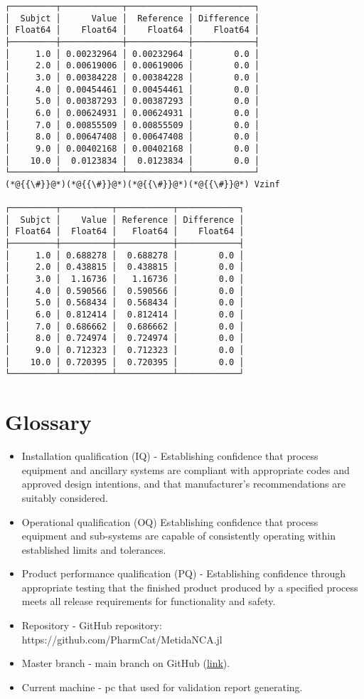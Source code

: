 \documentclass[12pt,a4paper]{article}
\begin{document}
\begin{lstlisting}
┌─────────┬────────────┬────────────┬────────────┐
│  Subjct │      Value │  Reference │ Difference │
│ Float64 │    Float64 │    Float64 │    Float64 │
├─────────┼────────────┼────────────┼────────────┤
│     1.0 │ 0.00232964 │ 0.00232964 │        0.0 │
│     2.0 │ 0.00619006 │ 0.00619006 │        0.0 │
│     3.0 │ 0.00384228 │ 0.00384228 │        0.0 │
│     4.0 │ 0.00454461 │ 0.00454461 │        0.0 │
│     5.0 │ 0.00387293 │ 0.00387293 │        0.0 │
│     6.0 │ 0.00624931 │ 0.00624931 │        0.0 │
│     7.0 │ 0.00855509 │ 0.00855509 │        0.0 │
│     8.0 │ 0.00647408 │ 0.00647408 │        0.0 │
│     9.0 │ 0.00402168 │ 0.00402168 │        0.0 │
│    10.0 │  0.0123834 │  0.0123834 │        0.0 │
└─────────┴────────────┴────────────┴────────────┘
(*@{{\#}}@*)(*@{{\#}}@*)(*@{{\#}}@*)(*@{{\#}}@*) Vzinf

┌─────────┬──────────┬───────────┬────────────┐
│  Subjct │    Value │ Reference │ Difference │
│ Float64 │  Float64 │   Float64 │    Float64 │
├─────────┼──────────┼───────────┼────────────┤
│     1.0 │ 0.688278 │  0.688278 │        0.0 │
│     2.0 │ 0.438815 │  0.438815 │        0.0 │
│     3.0 │  1.16736 │   1.16736 │        0.0 │
│     4.0 │ 0.590566 │  0.590566 │        0.0 │
│     5.0 │ 0.568434 │  0.568434 │        0.0 │
│     6.0 │ 0.812414 │  0.812414 │        0.0 │
│     7.0 │ 0.686662 │  0.686662 │        0.0 │
│     8.0 │ 0.724974 │  0.724974 │        0.0 │
│     9.0 │ 0.712323 │  0.712323 │        0.0 │
│    10.0 │ 0.720395 │  0.720395 │        0.0 │
└─────────┴──────────┴───────────┴────────────┘
\end{lstlisting}


\section{Glossary}
\begin{itemize}
\item Installation qualification (IQ) - Establishing confidence that process equipment and ancillary systems are compliant with appropriate codes and approved design intentions, and that manufacturer's recommendations are suitably considered.


\item Operational qualification (OQ) Establishing confidence that process equipment and sub-systems are capable of consistently operating within established limits and tolerances.


\item Product performance qualification (PQ) - Establishing confidence through appropriate testing that the finished product produced by a specified process meets all release requirements for functionality and safety.


\item Repository - GitHub repository: https://github.com/PharmCat/MetidaNCA.jl


\item Master branch - main branch on GitHub (\href{https://github.com/PharmCat/MetidaNCA.jl/tree/main}{link}).


\item Current machine - pc that used for validation report generating.

\end{itemize}
\end{document}
